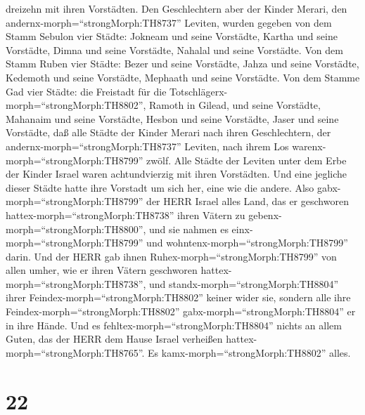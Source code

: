 dreizehn mit ihren Vorstädten.  Den Geschlechtern aber der
Kinder Merari, den andernx-morph=``strongMorph:TH8737'' Leviten, wurden
gegeben von dem Stamm Sebulon vier Städte: Jokneam und seine Vorstädte,
Kartha und seine Vorstädte,  Dimna und seine Vorstädte,
Nahalal und seine Vorstädte.  Von dem Stamm Ruben vier
Städte: Bezer und seine Vorstädte, Jahza und seine Vorstädte,
 Kedemoth und seine Vorstädte, Mephaath und seine
Vorstädte.  Von dem Stamme Gad vier Städte: die Freistadt
für die Totschlägerx-morph=``strongMorph:TH8802'', Ramoth in Gilead, und
seine Vorstädte,  Mahanaim und seine Vorstädte, Hesbon und
seine Vorstädte, Jaser und seine Vorstädte,  daß alle
Städte der Kinder Merari nach ihren Geschlechtern, der
andernx-morph=``strongMorph:TH8737'' Leviten, nach ihrem Los
warenx-morph=``strongMorph:TH8799'' zwölf.  Alle Städte der
Leviten unter dem Erbe der Kinder Israel waren achtundvierzig mit ihren
Vorstädten.  Und eine jegliche dieser Städte hatte ihre
Vorstadt um sich her, eine wie die andere.  Also
gabx-morph=``strongMorph:TH8799'' der HERR Israel alles Land, das er
geschworen hattex-morph=``strongMorph:TH8738'' ihren Vätern zu
gebenx-morph=``strongMorph:TH8800'', und sie nahmen es
einx-morph=``strongMorph:TH8799'' und
wohntenx-morph=``strongMorph:TH8799'' darin.  Und der HERR
gab ihnen Ruhex-morph=``strongMorph:TH8799'' von allen umher, wie er
ihren Vätern geschworen hattex-morph=``strongMorph:TH8738'', und
standx-morph=``strongMorph:TH8804'' ihrer
Feindex-morph=``strongMorph:TH8802'' keiner wider sie, sondern alle ihre
Feindex-morph=``strongMorph:TH8802'' gabx-morph=``strongMorph:TH8804''
er in ihre Hände.  Und es
fehltex-morph=``strongMorph:TH8804'' nichts an allem Guten, das der HERR
dem Hause Israel verheißen hattex-morph=``strongMorph:TH8765''. Es
kamx-morph=``strongMorph:TH8802'' alles.

\hypertarget{section-21}{%
\section{22}\label{section-21}}

